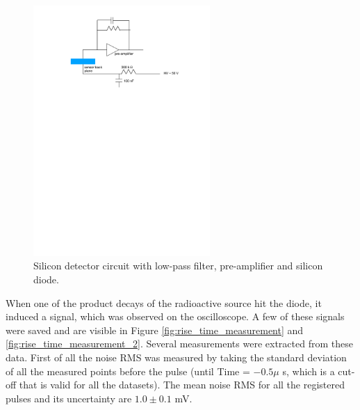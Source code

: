 \documentclass[12pt]{article}
\begin{document}
\begin{figure}[htb]
  \centering
  \includegraphics[width=0.6\textwidth]{./graphics/SiliconDiodeCircuit}
  \caption{Silicon detector circuit with low-pass filter, pre-amplifier and silicon diode.}
  \label{fig:SiliconDiodeCircuit}
\end{figure}



When one of the product decays of the radioactive source hit the diode, it induced a signal, which was observed on the oscilloscope. A few of these signals were saved and are visible in Figure \ref{fig:rise_time_measurement} and \ref{fig:rise_time_measurement_2}. Several measurements were extracted from these data. First of all the noise RMS was measured by taking the standard deviation of all the measured points before the pulse (until Time = $-0.5\mu$ s, which is a cut-off that is valid for all the datasets). The mean noise RMS for all the registered pulses and its uncertainty are $1.0 \pm 0.1$ mV.
\end{document}
